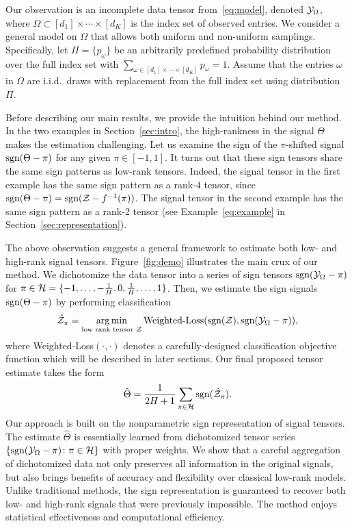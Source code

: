 \documentclass[useAMS,usenatbib,usegraphicx,referee]{biom}
\theoremstyle{plain}
\theoremstyle{definition}
\def\sign{\textup{sgn}}
\begin{document}
Our observation is an incomplete data tensor from~\eqref{eq:model}, denoted  $\mathcal{Y}_\Omega$, where $\Omega\subset[d_1]\times\cdots\times[d_K]$ is the index set of observed entries. We consider a general model on $\Omega$ that allows both uniform and non-uniform samplings. Specifically, let $\Pi=\{p_\omega\}$ be an arbitrarily predefined probability distribution over the full index set with $\sum_{\omega\in[d_1]\times \cdots \times [d_K]}p_\omega=1$. Assume that the entries $\omega$ in $\Omega$ are i.i.d.\ draws with replacement from the full index set using distribution $\Pi$. 

Before describing our main results, we provide the intuition behind our method. In the two examples in Section~\ref{sec:intro}, the high-rankness in the signal $\Theta$ makes the estimation challenging. Let us examine the sign of the $\pi$-shifted signal $\sign(\Theta-\pi)$ for any given $\pi\in[-1,1]$. It turns out that these sign tensors share the same sign patterns as low-rank tensors. Indeed, the signal tensor in the first example has the same sign pattern as a rank-$4$ tensor, since $\sign(\Theta-\pi)=\sign(\tZ-f^{-1}(\pi))$. The signal tensor in the second example has the same sign pattern as a rank-2 tensor (see Example~\ref{eq:example} in Section~\ref{sec:representation}).


The above observation suggests a general framework to estimate both low- and high-rank signal tensors. Figure~\ref{fig:demo} illustrates the main crux of our method. We dichotomize the data tensor into a series of sign tensors $\sign (\tY_\Omega-\pi)$ for $\pi\in \tH={\{\small-1,\ldots,  -{1\over H},0, {1\over H},\ldots,1\}}$. Then, we estimate the sign signals $\sign(\Theta-\pi)$ by performing classification
\[
\hat \tZ_\pi=\argmin_{\text{low rank tensor $\tZ$}} \text{Weighted-Loss}(\sign(\tZ), \sign (\tY_\Omega-\pi)),
\]
where Weighted-Loss$(\cdot,\cdot)$ denotes a carefully-designed classification objective function which will be described in later sections. Our final proposed tensor estimate takes the form
\vspace{-.5cm}
\[
\hat \Theta = {1\over 2H+1}\sum_{\pi \in \tH} \sign(\hat \tZ_\pi).
\]
Our approach is built on the nonparametric sign representation of signal tensors. The estimate $\hat \Theta$ is essentially learned from dichotomized tensor series $\{\sign(\tY_\Omega-\pi)\colon \pi \in \tH\}$ with proper weights. We show that a careful aggregation of dichotomized data not only preserves all information in the original signals, but also brings benefits of accuracy and flexibility over classical low-rank models. Unlike traditional methods, the sign representation is guaranteed to recover both low- and high-rank signals that were previously impossible. The method enjoys statistical effectiveness and computational efficiency. 
\end{document}
